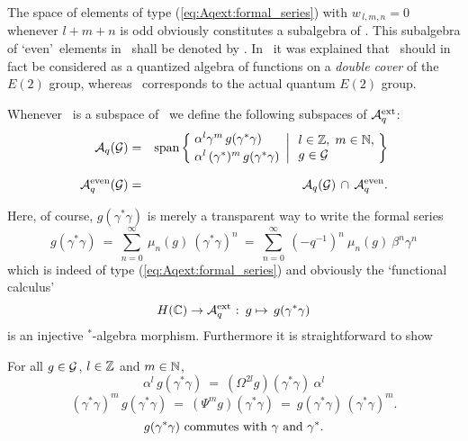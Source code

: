 The space of elements of type (\ref{eq:Aqext:formal_series}) with
$w_{\, l,m,n}=0$ whenever $l+m+n$ is odd obviously constitutes a subalgebra of \Aqext\@.
This subalgebra of \lq even\rq\ elements in \Aqext\ shall be denoted by \Aqeven\@.
In \cite{Koelink:thesis,Koelink:QE2}\ it was explained that \Aqext\ should in fact
be considered as a quantized algebra of functions on a {\em double cover\/}
of the $E(2)$ group, whereas \Aqeven\ corresponds to the actual quantum $E(2)$ group.



\begin{defn*}
Whenever \calG\ is a subspace of \HC\ we define the following subspaces of ${\mathcal A}_q^{\rm ext}\!\,$:
\begin{eqnarray*}
\AqG &=&
     \mbox{span} \left\{ \!\! \left.\begin{array}{l}
            \alpha^l \gamma^m \,g(\gamma^*\gamma)   \\ \vertL
            \alpha^l \,(\gamma^*)^m \,g(\gamma^*\gamma)
            \end{array}
            \right|   \begin{array}{l}
            l\in\ZZ, \; m\in\NN, \\
            g\in\calG  \end{array} \! \right\}
\\ \vertXL
\Aqeven(\calG) &=& \AqG \, \cap \, \Aqeven.
\end{eqnarray*}
\end{defn*}



Here, of course, $g(\gamma^*\gamma)$ is merely a transparent way to write the
formal series
\begin{equation} \label{eq:functions_of_gamma*gamma}
 g(\gamma^*\gamma)
    \:=\:  \sum_{n=0}^{\infty} \: \mu_n(g) \:(\gamma^*\gamma)^n
    \:=\:  \sum_{n=0}^{\infty} \: (-q^{-1})^n\: \mu_n(g) \:\beta^n \gamma^n
\end{equation}
which is indeed of type (\ref{eq:Aqext:formal_series}) and obviously the
\lq functional calculus\rq\
$$H(\mathbb{C}) \rightarrow {\mathcal A}_q^{\rm ext}\! \: :\: g \mapsto\, g(\gamma^*\gamma)$$
is an injective $^*$-algebra morphism. Furthermore it is straightforward to show



\begin{lemma}  \label{lem:functional_calc:Aq:properties}
For all\/ $g\in\mathcal G$, $l\in\mathbb{Z}$ and\/ $m\in\mathbb{N}$,
  $$  \alpha^l \, g(\gamma^*\gamma)
        \:=\: (\Omega^{2l} g)(\gamma^*\gamma) \:\alpha^l  $$
  $$   (\gamma^*\gamma)^m \, g(\gamma^*\gamma)
        \:=\: (\Psi^m g)(\gamma^*\gamma) \:=\:
        g(\gamma^*\gamma)\, (\gamma^*\gamma)^m. $$
  $$   g(\gamma^*\gamma) \mbox{ commutes with\/ } \gamma \mbox{ and\/ } \gamma^*. $$
\end{lemma}




